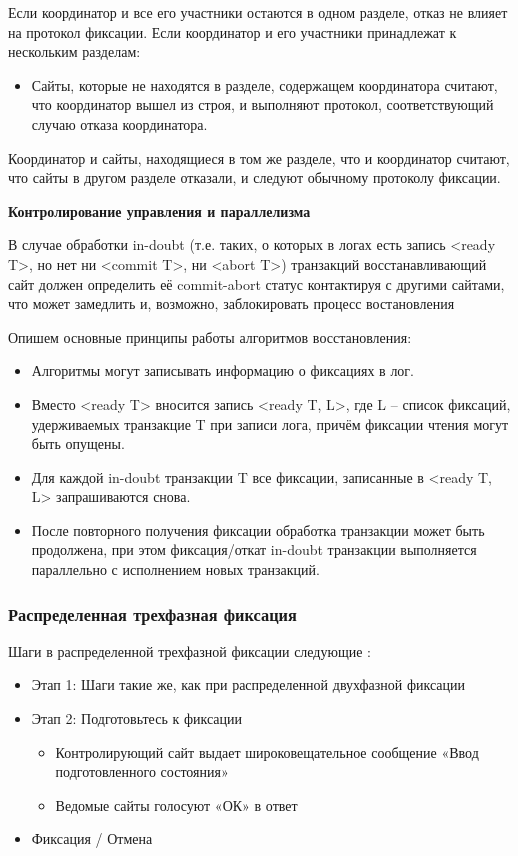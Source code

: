 \begin{itemize}
Если координатор и все его участники остаются в одном разделе, отказ не влияет на протокол фиксации. %
Если координатор и его участники принадлежат к нескольким разделам:
\begin{itemize}
\item Сайты, которые не находятся в разделе, содержащем координатора считают, что координатор вышел из строя, и выполняют протокол, соответствующий случаю отказа координатора.

\end{itemize}
Координатор и сайты, находящиеся в том же разделе, что и координатор считают, что сайты в другом разделе отказали, и следуют обычному протоколу фиксации.


\end{itemize}

\bigbreak
\textbf{Контролирование управления и параллелизма}

В случае обработки in-doubt (т.е. таких, о которых в логах есть запись <ready T>, но нет ни <commit T>, ни <abort T>) транзакций восстанавливающий сайт должен определить её commit-abort статус контактируя с другими сайтами, что может замедлить и, возможно, заблокировать процесс востановления %

Опишем основные принципы работы алгоритмов восстановления:
\begin{itemize}
    \item Алгоритмы могут записывать информацию о фиксациях в лог.
    \item Вместо <ready T> вносится запись <ready T, L>, где L -- список фиксаций, удерживаемых транзакцие T при записи лога, причём фиксации чтения могут быть опущены.
    \item Для каждой in-doubt транзакции T все фиксации, записанные в <ready T, L> запрашиваются снова.
    \item После повторного получения фиксации обработка транзакции может быть продолжена, при этом фиксация/откат in-doubt транзакции выполняется параллельно с исполнением новых транзакций.
\end{itemize}

\bigbreak
\subsubsection{Распределенная трехфазная фиксация}
Шаги в распределенной трехфазной фиксации следующие \autocite{FixProtocols}:
\begin{itemize}
    \item Этап 1: Шаги такие же, как при распределенной двухфазной фиксации
    \item Этап 2: Подготовьтесь к фиксации
    \begin{itemize}
        \item Контролирующий сайт выдает широковещательное сообщение «Ввод подготовленного состояния»
        \item Ведомые сайты голосуют «ОК» в ответ
    \end{itemize}
    \item Фиксация / Отмена
\end{itemize}

